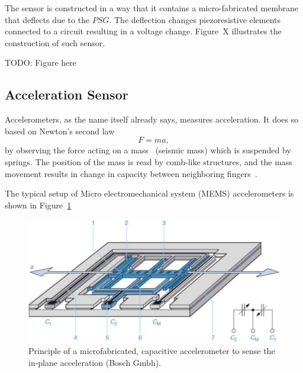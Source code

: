 \documentclass[DIV=14]{scrartcl}
\begin{document}
    The sensor is constructed in a way that it contains a micro-fabricated membrane that deflects due to the $PSG$.
    The deflection changes piezoresistive elements connected to a circuit resulting in a voltage change.
    Figure~X illustrates the construction of such sensor.

    TODO: Figure here


    \subsection{Acceleration Sensor}
    Accelerometers, as the name itself already says, measures acceleration.
    It does so based on Newton's second law
    \begin{equation}
        F = ma
        \label{eq:newtonsLaw},
    \end{equation}
    by observing the force acting on a mass~\cite{labManual} (seismic mass) which is suspended by springs.
    The position of the mass is read by comb-like structures, and the mass movement results in change in capacity
    between neighboring fingers~\cite{labManual}.

    The typical setup of Micro electromechanical system (MEMS) accelerometers is shown in Figure~\ref{fig:accelerometer}
    \begin{figure}[h]
        \centering
        \includegraphics[width=.6\textwidth]{figures/accelerometer}
        \caption{Principle of a microfabricated, capacitive accelerometer to sense the in-plane acceleration (Bosch Gmbh).}
        \label{fig:accelerometer}
    \end{figure}
\end{document}
